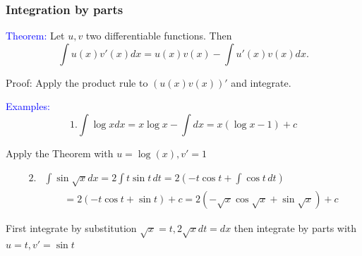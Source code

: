 \documentclass[11pt,aspectratio=169]{beamer}
\begin{document}
\begin{frame}
\frametitle{Integration by parts}
\begin{small}
\textcolor{blue}{Theorem:} Let $u,v$ two differentiable functions. Then
$$
 \int u(x)v'(x) dx=u(x)v(x)- \int u'(x)v(x) dx.
$$

\begin{tiny}Proof: Apply the product  rule to $(u(x)v(x))'$ and integrate. \end{tiny}

\textcolor{blue}{Examples:} 
$$
1. \int \log x dx=x \log x-\int dx=x(\log x -1) +c 
 $$
 
 \begin{tiny} Apply the Theorem with $u=\log(x), v'=1$\end{tiny}
 
\begin{equation*} \begin{split}
2. &\int \sin \sqrt{x} dx=2 \int t \sin t \, dt= 2 (-t\cos t +\int \cos t \, dt)\\
&\qquad =2(-t\cos t+\sin t) +c =2(-\sqrt{x} \cos \sqrt{x}+\sin \sqrt{x})+c
 \end{split}
 \end{equation*}
 
  \begin{tiny} First integrate by substitution $\sqrt{x}=t, 2 \sqrt{x} dt=dx$ then integrate by parts with $u=t, v'=\sin t$\end{tiny}
\end{small}


\end{frame}
\end{document}

